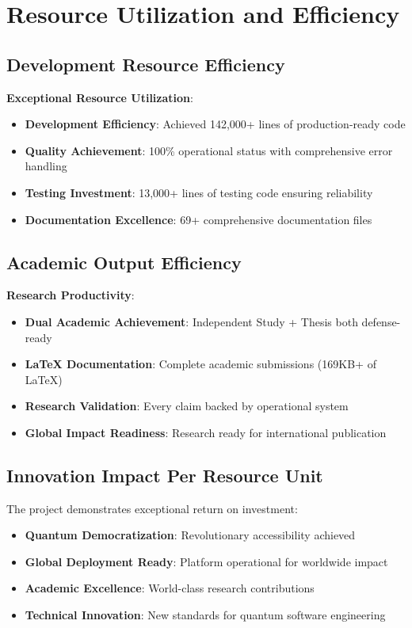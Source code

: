 \documentclass[12pt,a4paper]{article}
\begin{document}
\section{Resource Utilization and Efficiency}

\subsection{Development Resource Efficiency}

\textbf{Exceptional Resource Utilization}:
\begin{itemize}
    \item \textbf{Development Efficiency}: Achieved 142,000+ lines of production-ready code
    \item \textbf{Quality Achievement}: 100\% operational status with comprehensive error handling
    \item \textbf{Testing Investment}: 13,000+ lines of testing code ensuring reliability
    \item \textbf{Documentation Excellence}: 69+ comprehensive documentation files
\end{itemize}

\subsection{Academic Output Efficiency}

\textbf{Research Productivity}:
\begin{itemize}
    \item \textbf{Dual Academic Achievement}: Independent Study + Thesis both defense-ready
    \item \textbf{LaTeX Documentation}: Complete academic submissions (169KB+ of LaTeX)
    \item \textbf{Research Validation}: Every claim backed by operational system
    \item \textbf{Global Impact Readiness}: Research ready for international publication
\end{itemize}

\subsection{Innovation Impact Per Resource Unit}

The project demonstrates exceptional return on investment:
\begin{itemize}
    \item \textbf{Quantum Democratization}: Revolutionary accessibility achieved
    \item \textbf{Global Deployment Ready}: Platform operational for worldwide impact
    \item \textbf{Academic Excellence}: World-class research contributions
    \item \textbf{Technical Innovation}: New standards for quantum software engineering
\end{itemize}
\end{document}
